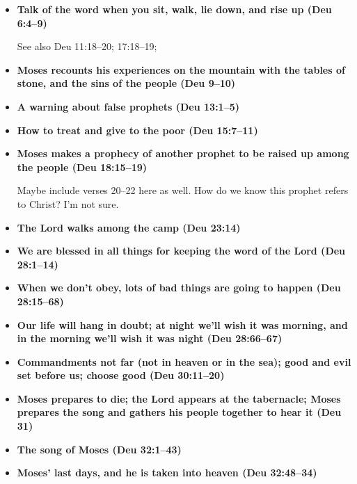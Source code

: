 \begin{itemize}
	It's hard to break this down further; there is a lot of good stuff in these chapters and it's worth reading them a few times. Lots of interesting points.

\item \textbf{Talk of the word when you sit, walk, lie down, and rise up (Deu 6:4--9)}

	See also Deu 11:18--20; 17:18--19;

\item \textbf{Moses recounts his experiences on the mountain with the tables of stone, and the sins of the people (Deu 9--10)}

\item \textbf{A warning about false prophets (Deu 13:1--5)}

\item \textbf{How to treat and give to the poor (Deu 15:7--11)}

\item \textbf{Moses makes a prophecy of another prophet to be raised up among the people (Deu 18:15--19)}

	Maybe include verses 20--22 here as well. How do we know this prophet refers to Christ? I'm not sure.

\item \textbf{The Lord walks among the camp (Deu 23:14)}

\item \textbf{We are blessed in all things for keeping the word of the Lord (Deu 28:1--14)}

\item \textbf{When we don't obey, lots of bad things are going to happen (Deu 28:15--68)}

\item \textbf{Our life will hang in doubt; at night we'll wish it was morning, and in the morning we'll wish it was night (Deu 28:66--67)}

\item \textbf{Commandments not far (not in heaven or in the sea); good and evil set before us; choose good (Deu 30:11--20)}

\item \textbf{Moses prepares to die; the Lord appears at the tabernacle; Moses prepares the song and gathers his people together to hear it (Deu 31)}

\item \textbf{The song of Moses (Deu 32:1--43)}

\item \textbf{Moses' last days, and he is taken into heaven (Deu 32:48--34)}


\end{itemize}
